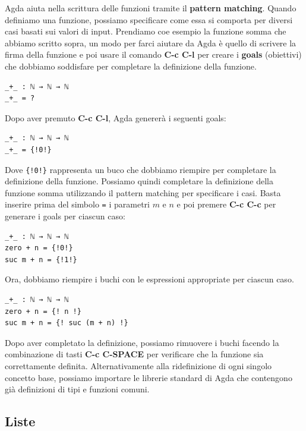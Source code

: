 \documentclass[a4paper]{article}
\theoremstyle{definition}
\theoremstyle{remark}
\begin{document}
Agda aiuta nella scrittura delle funzioni tramite il \textbf{pattern matching}.
Quando definiamo una funzione, possiamo specificare come essa si comporta per diversi casi
basati sui valori di input. Prendiamo coe esempio la funzione somma che abbiamo scritto sopra, un modo
per farci aiutare da Agda è quello di scrivere la firma della funzione e poi
usare il comando \textbf{C-c C-l} per creare i \textbf{goals} (obiettivi) che dobbiamo
soddisfare per completare la definizione della funzione.
\begin{verbatim}
_+_ : ℕ → ℕ → ℕ
_+_ = ?
\end{verbatim}
Dopo aver premuto \textbf{C-c C-l}, Agda genererà i seguenti goals:
\begin{verbatim}
_+_ : ℕ → ℕ → ℕ
_+_ = {!0!}
\end{verbatim}
Dove \texttt{\{!0!\}} rappresenta un buco che dobbiamo riempire per completare la definizione della funzione.
Possiamo quindi completare la definizione della funzione somma
utilizzando il pattern matching per specificare i casi. Basta inserire prima del simbolo \texttt{=} i parametri
$m$ e $n$ e poi premere \textbf{C-c C-c} per generare i goals per ciascun caso:
\begin{verbatim}
_+_ : ℕ → ℕ → ℕ
zero + n = {!0!}
suc m + n = {!1!}
\end{verbatim}
Ora, dobbiamo riempire i buchi con le espressioni appropriate per ciascun caso.
\begin{verbatim}
_+_ : ℕ → ℕ → ℕ
zero + n = {! n !}
suc m + n = {! suc (m + n) !}
\end{verbatim}
Dopo aver completato la definizione, possiamo rimuovere i buchi facendo
la combinazione di tasti \textbf{C-c C-SPACE} per verificare che la funzione sia correttamente definita.
Alternativamente alla ridefinizione di ogni singolo concetto base, possiamo importare
le librerie standard di Agda che contengono già
definizioni di tipi e funzioni comuni.

\subsection{Liste}
\end{document}
